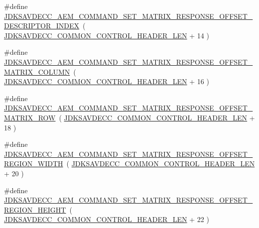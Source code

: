 \begin{DoxyCompactItemize}
\#define \hyperlink{group__command__set__matrix__response_ga68a9c5d637b0e7052024069ef29985e6}{J\+D\+K\+S\+A\+V\+D\+E\+C\+C\+\_\+\+A\+E\+M\+\_\+\+C\+O\+M\+M\+A\+N\+D\+\_\+\+S\+E\+T\+\_\+\+M\+A\+T\+R\+I\+X\+\_\+\+R\+E\+S\+P\+O\+N\+S\+E\+\_\+\+O\+F\+F\+S\+E\+T\+\_\+\+D\+E\+S\+C\+R\+I\+P\+T\+O\+R\+\_\+\+I\+N\+D\+EX}~( \hyperlink{group__jdksavdecc__avtp__common__control__header_gaae84052886fb1bb42f3bc5f85b741dff}{J\+D\+K\+S\+A\+V\+D\+E\+C\+C\+\_\+\+C\+O\+M\+M\+O\+N\+\_\+\+C\+O\+N\+T\+R\+O\+L\+\_\+\+H\+E\+A\+D\+E\+R\+\_\+\+L\+EN} + 14 )
\item 
\#define \hyperlink{group__command__set__matrix__response_ga15a3598bf86af74dbee722dc95ce2fc4}{J\+D\+K\+S\+A\+V\+D\+E\+C\+C\+\_\+\+A\+E\+M\+\_\+\+C\+O\+M\+M\+A\+N\+D\+\_\+\+S\+E\+T\+\_\+\+M\+A\+T\+R\+I\+X\+\_\+\+R\+E\+S\+P\+O\+N\+S\+E\+\_\+\+O\+F\+F\+S\+E\+T\+\_\+\+M\+A\+T\+R\+I\+X\+\_\+\+C\+O\+L\+U\+MN}~( \hyperlink{group__jdksavdecc__avtp__common__control__header_gaae84052886fb1bb42f3bc5f85b741dff}{J\+D\+K\+S\+A\+V\+D\+E\+C\+C\+\_\+\+C\+O\+M\+M\+O\+N\+\_\+\+C\+O\+N\+T\+R\+O\+L\+\_\+\+H\+E\+A\+D\+E\+R\+\_\+\+L\+EN} + 16 )
\item 
\#define \hyperlink{group__command__set__matrix__response_ga3d5cf4782e71e7cb720a8a3ec45e31e3}{J\+D\+K\+S\+A\+V\+D\+E\+C\+C\+\_\+\+A\+E\+M\+\_\+\+C\+O\+M\+M\+A\+N\+D\+\_\+\+S\+E\+T\+\_\+\+M\+A\+T\+R\+I\+X\+\_\+\+R\+E\+S\+P\+O\+N\+S\+E\+\_\+\+O\+F\+F\+S\+E\+T\+\_\+\+M\+A\+T\+R\+I\+X\+\_\+\+R\+OW}~( \hyperlink{group__jdksavdecc__avtp__common__control__header_gaae84052886fb1bb42f3bc5f85b741dff}{J\+D\+K\+S\+A\+V\+D\+E\+C\+C\+\_\+\+C\+O\+M\+M\+O\+N\+\_\+\+C\+O\+N\+T\+R\+O\+L\+\_\+\+H\+E\+A\+D\+E\+R\+\_\+\+L\+EN} + 18 )
\item 
\#define \hyperlink{group__command__set__matrix__response_gae00abbd299e920be65ed5cd1d422efd0}{J\+D\+K\+S\+A\+V\+D\+E\+C\+C\+\_\+\+A\+E\+M\+\_\+\+C\+O\+M\+M\+A\+N\+D\+\_\+\+S\+E\+T\+\_\+\+M\+A\+T\+R\+I\+X\+\_\+\+R\+E\+S\+P\+O\+N\+S\+E\+\_\+\+O\+F\+F\+S\+E\+T\+\_\+\+R\+E\+G\+I\+O\+N\+\_\+\+W\+I\+D\+TH}~( \hyperlink{group__jdksavdecc__avtp__common__control__header_gaae84052886fb1bb42f3bc5f85b741dff}{J\+D\+K\+S\+A\+V\+D\+E\+C\+C\+\_\+\+C\+O\+M\+M\+O\+N\+\_\+\+C\+O\+N\+T\+R\+O\+L\+\_\+\+H\+E\+A\+D\+E\+R\+\_\+\+L\+EN} + 20 )
\item 
\#define \hyperlink{group__command__set__matrix__response_gaabeb52b9da1b74002a34fa744d21470a}{J\+D\+K\+S\+A\+V\+D\+E\+C\+C\+\_\+\+A\+E\+M\+\_\+\+C\+O\+M\+M\+A\+N\+D\+\_\+\+S\+E\+T\+\_\+\+M\+A\+T\+R\+I\+X\+\_\+\+R\+E\+S\+P\+O\+N\+S\+E\+\_\+\+O\+F\+F\+S\+E\+T\+\_\+\+R\+E\+G\+I\+O\+N\+\_\+\+H\+E\+I\+G\+HT}~( \hyperlink{group__jdksavdecc__avtp__common__control__header_gaae84052886fb1bb42f3bc5f85b741dff}{J\+D\+K\+S\+A\+V\+D\+E\+C\+C\+\_\+\+C\+O\+M\+M\+O\+N\+\_\+\+C\+O\+N\+T\+R\+O\+L\+\_\+\+H\+E\+A\+D\+E\+R\+\_\+\+L\+EN} + 22 )

\end{DoxyCompactItemize}
